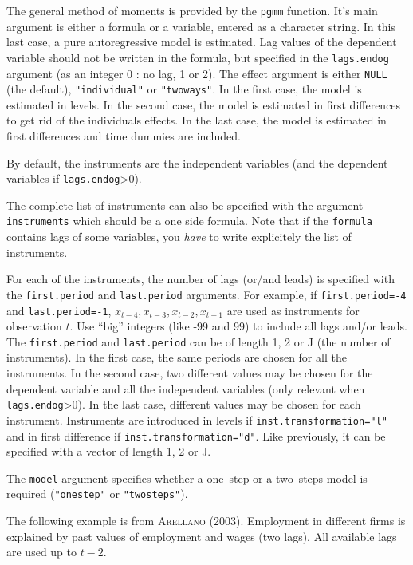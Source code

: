 \documentclass{article}
\begin{document}
The general method of moments is provided by the \texttt{pgmm}
function. It's main argument is either a formula or a variable,
entered as a character string. In this last case, a pure
autoregressive model is estimated. Lag values of the dependent
variable should not be written in the formula, but specified in the
\texttt{lags.endog} argument (as an integer 0 : no lag, 1 or 2).
The effect argument is either \texttt{NULL} (the default),
\texttt{"individual"} or \texttt{"twoways"}. In the first case, the
model is estimated in levels. In the second case, the model is
estimated in first differences to get rid of the individuals
effects. In the last case, the model is estimated in first differences
and time dummies are included. 

By default, the instruments are the
independent variables (and the dependent variables if \texttt{lags.endog}>0).

The complete list of instruments can also be specified with the
argument \texttt{instruments} which should be a one side formula. 
Note that if the \texttt{formula} contains lags of some variables, you
\emph{have} to write explicitely the list of instruments.

For each of the instruments, the number of lags (or/and leads) is
specified with the \texttt{first.period} and \texttt{last.period}
arguments. For example, if \texttt{first.period=-4} and
\texttt{last.period=-1}, $x_{t-4},x_{t-3}, x_{t-2}, x_{t-1}$ are used
as instruments for observation $t$. Use ``big'' integers (like -99 and
99) to include all lags and/or leads. The \texttt{first.period} and
\texttt{last.period} can be of length 1, 2 or J (the number of
instruments). In the first case, the same periods are chosen for all
the instruments. In the second case, two different values may be
chosen for the dependent variable and all the independent variables
(only relevant when \texttt{lags.endog}>0). In the last case,
different values may be chosen for each instrument. Instruments are
introduced in levels if \texttt{inst.transformation="l"} and in first
difference if \texttt{inst.transformation="d"}. Like previously, it can be
specified with a vector of length 1, 2 or J.

The \texttt{model} argument specifies whether a one--step or a
two--steps model is required (\texttt{"onestep"} or \texttt{"twosteps"}).

The  following example is from \textsc{Arellano} (2003). Employment in
different firms is explained by past values of employment and wages
(two lags). All available lags are used up to $t-2$.
\end{document}
